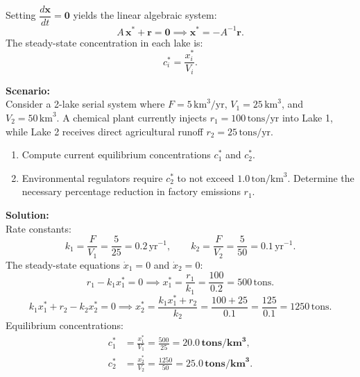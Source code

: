 \documentclass[12pt]{article}
\begin{document}
\begin{defbox}
Setting $\dfrac{d\mathbf{x}}{dt} = \mathbf{0}$ yields the linear algebraic system:
\begin{equation}
  A\,\mathbf{x}^* + \mathbf{r} = \mathbf{0} \implies \mathbf{x}^* = -A^{-1}\mathbf{r}.
\end{equation}
The steady-state concentration in each lake is:
\begin{equation}
  c_i^* = \frac{x_i^*}{V_i}.
\end{equation}
\end{defbox}

\begin{examplebox*}
\textbf{Scenario:}\\
Consider a 2-lake serial system where $F = 5\,\text{km}^3/\text{yr}$, $V_1 = 25\,\text{km}^3$, and $V_2 = 50\,\text{km}^3$.
A chemical plant currently injects $r_1 = 100\,\text{tons}/\text{yr}$ into Lake 1, while Lake 2 receives direct agricultural runoff $r_2 = 25\,\text{tons}/\text{yr}$.
\begin{enumerate}[label=(\alph*), itemsep=2pt]
  \item Compute current equilibrium concentrations $c_1^*$ and $c_2^*$.
  \item Environmental regulators require $c_2^*$ to not exceed $1.0\,\text{ton}/\text{km}^3$. Determine the necessary percentage reduction in factory emissions $r_1$.
\end{enumerate}

\vspace{6pt}
\textbf{Solution:}\\
Rate constants:
\[
  k_1 = \frac{F}{V_1} = \frac{5}{25} = 0.2\,\text{yr}^{-1}, \qquad k_2 = \frac{F}{V_2} = \frac{5}{50} = 0.1\,\text{yr}^{-1}.
\]
The steady-state equations $\dot{x}_1 = 0$ and $\dot{x}_2 = 0$:
\[
  r_1 - k_1 x_1^* = 0 \implies x_1^* = \frac{r_1}{k_1} = \frac{100}{0.2} = 500\,\text{tons}.
\]
\[
  k_1 x_1^* + r_2 - k_2 x_2^* = 0 \implies x_2^* = \frac{k_1 x_1^* + r_2}{k_2} = \frac{100 + 25}{0.1} = \frac{125}{0.1} = 1250\,\text{tons}.
\]
Equilibrium concentrations:
\begin{align*}
  c_1^* &= \frac{x_1^*}{V_1} = \frac{500}{25} = \mathbf{20.0\,\text{tons}/\text{km}^3},\\
  c_2^* &= \frac{x_2^*}{V_2} = \frac{1250}{50} = \mathbf{25.0\,\text{tons}/\text{km}^3}.
\end{align*}


\end{examplebox*}
\end{document}
